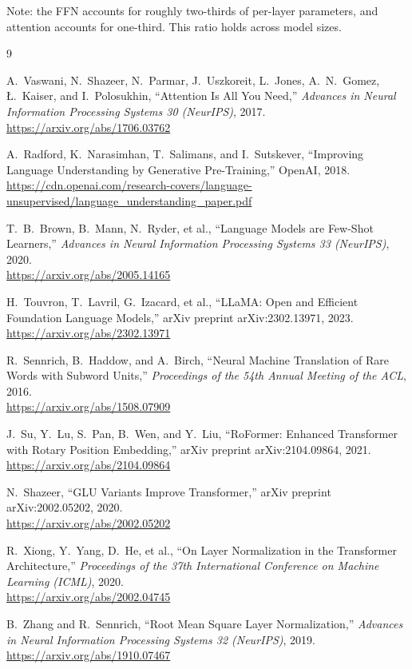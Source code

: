 \documentclass[11pt,a4paper]{article}
\begin{document}
Note: the FFN accounts for roughly two-thirds of per-layer parameters, and attention
accounts for one-third. This ratio holds across model sizes.


\newpage
\begin{thebibliography}{9}

  A.~Vaswani, N.~Shazeer, N.~Parmar, J.~Uszkoreit, L.~Jones, A.~N.~Gomez,
  \L.~Kaiser, and I.~Polosukhin,
  ``Attention Is All You Need,''
  \emph{Advances in Neural Information Processing Systems 30 (NeurIPS)}, 2017.
  \\\url{https://arxiv.org/abs/1706.03762}

  A.~Radford, K.~Narasimhan, T.~Salimans, and I.~Sutskever,
  ``Improving Language Understanding by Generative Pre-Training,''
  OpenAI, 2018.
  \\\url{https://cdn.openai.com/research-covers/language-unsupervised/language_understanding_paper.pdf}

  T.~B.~Brown, B.~Mann, N.~Ryder, et al.,
  ``Language Models are Few-Shot Learners,''
  \emph{Advances in Neural Information Processing Systems 33 (NeurIPS)}, 2020.
  \\\url{https://arxiv.org/abs/2005.14165}

  H.~Touvron, T.~Lavril, G.~Izacard, et al.,
  ``LLaMA: Open and Efficient Foundation Language Models,''
  arXiv preprint arXiv:2302.13971, 2023.
  \\\url{https://arxiv.org/abs/2302.13971}

  R.~Sennrich, B.~Haddow, and A.~Birch,
  ``Neural Machine Translation of Rare Words with Subword Units,''
  \emph{Proceedings of the 54th Annual Meeting of the ACL}, 2016.
  \\\url{https://arxiv.org/abs/1508.07909}

  J.~Su, Y.~Lu, S.~Pan, B.~Wen, and Y.~Liu,
  ``RoFormer: Enhanced Transformer with Rotary Position Embedding,''
  arXiv preprint arXiv:2104.09864, 2021.
  \\\url{https://arxiv.org/abs/2104.09864}

  N.~Shazeer,
  ``GLU Variants Improve Transformer,''
  arXiv preprint arXiv:2002.05202, 2020.
  \\\url{https://arxiv.org/abs/2002.05202}

  R.~Xiong, Y.~Yang, D.~He, et al.,
  ``On Layer Normalization in the Transformer Architecture,''
  \emph{Proceedings of the 37th International Conference on Machine Learning (ICML)}, 2020.
  \\\url{https://arxiv.org/abs/2002.04745}

  B.~Zhang and R.~Sennrich,
  ``Root Mean Square Layer Normalization,''
  \emph{Advances in Neural Information Processing Systems 32 (NeurIPS)}, 2019.
  \\\url{https://arxiv.org/abs/1910.07467}

\end{thebibliography}
\end{document}
